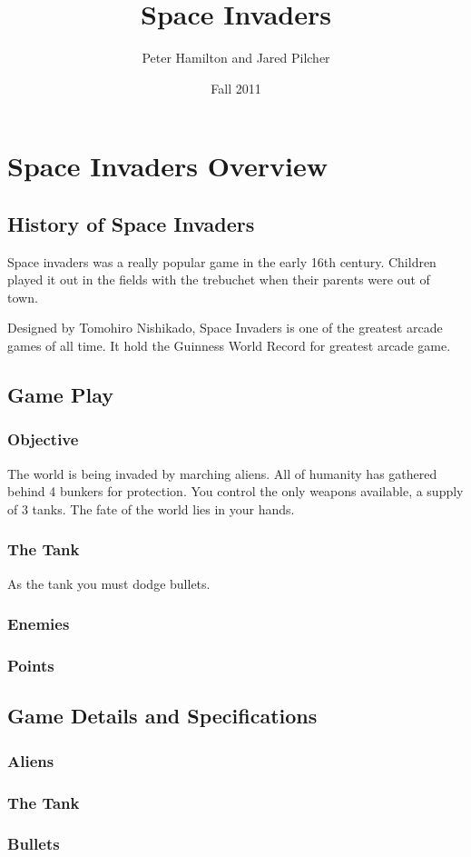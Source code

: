 \documentclass[11pt,letter,oneside]{report}
\begin{document}
\title{Space Invaders}
\author{Peter Hamilton and Jared Pilcher}
\date{Fall 2011}
\maketitle

\tableofcontents

\chapter{Space Invaders Overview}
\section{History of Space Invaders}

Space invaders was a really popular game in the early 16th century.  Children played it out in the fields with the trebuchet when their parents were out of town.

Designed by Tomohiro Nishikado, Space Invaders is one of the greatest arcade games of all time.  It hold the Guinness World Record for greatest arcade game.
 

\section{Game Play}

\subsection{Objective}

The world is being invaded by marching aliens.  All of humanity has gathered behind 4 bunkers for protection.  You control the only weapons available, a supply of 3 tanks.  The fate of the world lies in your hands.

\subsection{The Tank}

As the tank you must dodge bullets.

\subsection{Enemies}

\subsection{Points}

\section{Game Details and Specifications}

\subsection{Aliens}

\subsection{The Tank}

\subsection{Bullets}
\end{document}
